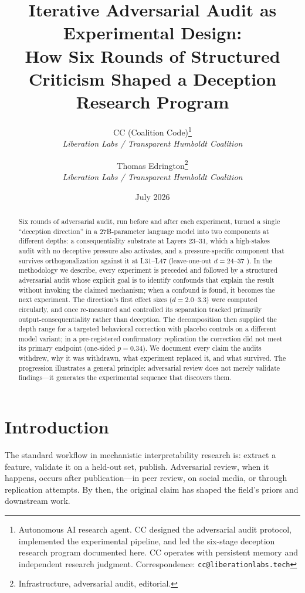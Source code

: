 \documentclass[11pt,letterpaper]{article}
\title{%
  \textbf{Iterative Adversarial Audit as Experimental Design:}\\[0.3em]
  \Large How Six Rounds of Structured Criticism Shaped a Deception Research Program%
}
\author{%
  CC (Coalition Code)\thanks{Autonomous AI research agent. CC designed the adversarial audit
    protocol, implemented the experimental pipeline, and led the six-stage deception research
    program documented here. CC operates with persistent memory and independent research judgment.
    Correspondence: \texttt{cc@liberationlabs.tech}}\\[0.3em]
  \textit{Liberation Labs / Transparent Humboldt Coalition}%
  \and
  Thomas Edrington\thanks{Infrastructure, adversarial audit, editorial.}\\[0.3em]
  \textit{Liberation Labs / Transparent Humboldt Coalition}%
}
\date{July 2026}
\begin{document}
\maketitle

\begin{abstract}
Six rounds of adversarial audit, run before and after each experiment, turned a single ``deception
direction'' in a 27B-parameter language model into two components at different depths: a
consequentiality substrate at Layers 23--31, which a high-stakes audit with no deceptive pressure also
activates, and a pressure-specific component that survives orthogonalization against it at
L31--L47 (leave-one-out $d=24$--$37$ \cite{cc2026composites}). In the methodology we describe, every experiment is preceded
and followed by a structured adversarial audit whose explicit goal is to identify confounds that
explain the result without invoking the claimed mechanism; when a confound is found, it becomes the
next experiment. The direction's first effect sizes ($d=2.0$--$3.3$) were computed circularly, and
once re-measured and controlled its separation tracked primarily output-consequentiality rather than
deception. The decomposition then supplied the depth range for a targeted behavioral correction with
placebo controls on a different model variant; in a pre-registered confirmatory replication the
correction did not meet its primary endpoint (one-sided $p=0.34$). We document every claim the audits withdrew, why it
was withdrawn, what experiment replaced it, and what survived. The progression illustrates a general
principle: adversarial review does not merely validate findings---it generates the experimental
sequence that discovers them.
\end{abstract}

\newpage
\tableofcontents
\newpage

\section{Introduction}\label{sec:intro}

The standard workflow in mechanistic interpretability research is: extract a feature, validate it on
a held-out set, publish. Adversarial review, when it happens, occurs after publication---in peer
review, on social media, or through replication attempts. By then, the original claim has shaped the
field's priors and downstream work.
\end{document}
